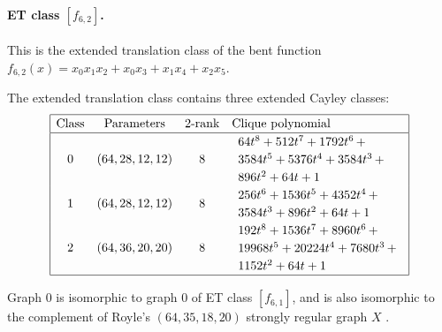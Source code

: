 \documentclass[12pt,a4paper]{article}
\begin{document}
\paragraph*{ET class $[f_{6,2}]$.}

This is the extended translation class of the bent function
$f_{6,2}(x) = x_{0} x_{1} x_{2} + x_{0} x_{3} + x_{1} x_{4} + x_{2} x_{5}$.

The extended translation class contains
three extended Cayley classes:
\small{}
\begin{align*}
\def\arraystretch{1.2}
\begin{array}{|cccl|}
\hline
\text{Class} &
\text{Parameters} &
\text{2-rank} &
\text{Clique polynomial}
\\
\hline
0 &
(64, 28, 12, 12) &
8 &
\begin{array}{l}
64t^{8} + 512t^{7} + 1792t^{6}
\,+
\\
 3584t^{5} + 5376t^{4} + 3584t^{3}
\,+
\\
 896t^{2} + 64t + 1
\end{array}
\\
1 &
(64, 28, 12, 12) &
8 &
\begin{array}{l}
256t^{6} + 1536t^{5} + 4352t^{4}
\,+
\\
 3584t^{3} + 896t^{2} + 64t + 1
\end{array}
\\
2 &
(64, 36, 20, 20) &
8 &
\begin{array}{l}
192t^{8} + 1536t^{7} + 8960t^{6}
\,+
\\
 19968t^{5} + 20224t^{4} + 7680t^{3}
\,+
\\
 1152t^{2} + 64t + 1
\end{array}
\\
\hline
\end{array}
\end{align*}


Graph 0 is isomorphic to graph 0 of ET class $[f_{6,1}]$,
and is also isomorphic to the complement of Royle's $(64,35,18,20)$ strongly regular graph $X$
\cite{Roy08normal}.
%
%
\end{document}
